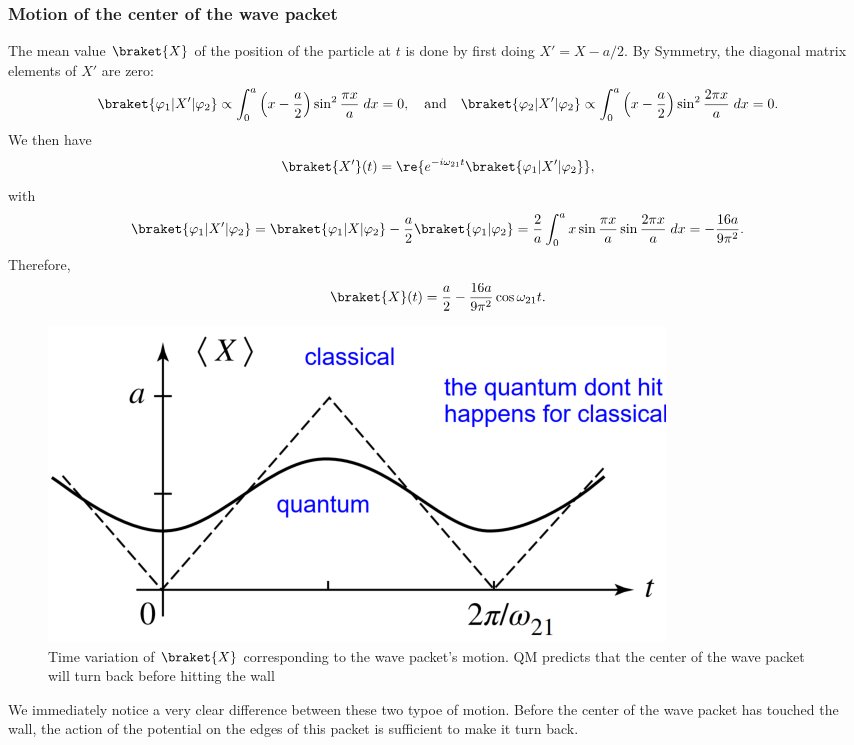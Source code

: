 \subsubsection{Motion of the center of the wave packet}
The mean value $\braket{X}$ of the position of the particle at $t$ is done by first doing $X'=X-a/2$. By Symmetry, the diagonal matrix elements of $X'$ are zero:
\begin{align*}
    \braket{\varphi_1|X'|\varphi_2}\propto\int_0^a\left(x-\frac{a}{2}\right)\sin^2\frac{\pi x}{a}\;dx=0,\quad\text{and}\quad\braket{\varphi_2|X'|\varphi_2}\propto\int_0^a\left(x-\frac{a}{2}\right)\sin^2\frac{2\pi x}{a}\;dx=0.
\end{align*}
We then have 
\begin{align*}
    \braket{X'}(t)=\re{e^{-i\omega_{21}t}\braket{\varphi_1|X'|\varphi_2}},
\end{align*}
with 
\begin{align*}
    \braket{\varphi_1|X'|\varphi_2}=\braket{\varphi_1|X|\varphi_2}-\frac{a}{2}\braket{\varphi_1|\varphi_2}=\frac{2}{a}\int_0^ax\sin\frac{\pi x}{a}\sin\frac{2\pi x}{a}\;dx=-\frac{16a}{9\pi^2}.
\end{align*}
Therefore, 
\begin{align*}
    \braket{X}(t)=\frac{a}{2}-\frac{16a}{9\pi^2}\cos\omega_{21}t.
\end{align*}
\begin{figure}[h!]
    \centering
    \includegraphics[width=.5\columnwidth]{PartOne/ChapterTwo/meanvalueinfinitewell.png}
    \caption{Time variation of $\braket{X}$ corresponding to the wave packet's motion. QM predicts that the center of the wave packet will turn back before hitting the wall}
\end{figure}
We immediately notice a very clear difference between these two typoe of motion. Before the center of the wave packet has touched the wall, the action of the potential on the edges 
of this packet is sufficient to make it turn back.

